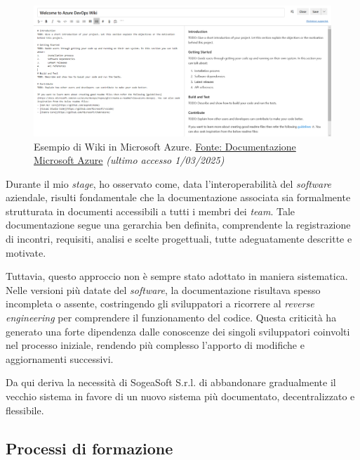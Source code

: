         \begin{figure}[H]
            \centering
            \includegraphics[width=0.9\linewidth]{BCS-Tessi/images/Wiki_Azure.png}
            \caption[Microsoft Azure, Wiki]{Esempio di Wiki in Microsoft Azure. \href{https://learn.microsoft.com/it-it/azure/devops/project/wiki/add-edit-wiki?view=azure-devops&tabs=browser}{Fonte: Documentazione Microsoft Azure} \textit{(ultimo accesso 1/03/2025)}}
            \label{fig:Wiki}
        \end{figure}
        
        \noindent Durante il mio \textit{stage}, ho osservato come, data l’interoperabilità del \textit{software} aziendale, risulti fondamentale che la documentazione associata sia formalmente strutturata in documenti accessibili a tutti i membri dei \textit{team}. Tale documentazione segue una gerarchia ben definita, comprendente la registrazione di incontri, requisiti, analisi e scelte progettuali, tutte adeguatamente descritte e motivate.  

        \vspace{0.2 em}
        \noindent Tuttavia, questo approccio non è sempre stato adottato in maniera sistematica. Nelle versioni più datate del \textit{software}, la documentazione risultava spesso incompleta o assente, costringendo gli sviluppatori a ricorrere al \textit{reverse engineering} per comprendere il funzionamento del codice. Questa criticità ha generato una forte dipendenza dalle conoscenze dei singoli sviluppatori coinvolti nel processo iniziale, rendendo più complesso l’apporto di modifiche e aggiornamenti successivi.  

        \vspace{0.2 em}
        \noindent Da qui deriva la necessità di SogeaSoft S.r.l. di abbandonare gradualmente il vecchio sistema in favore di un nuovo sistema più documentato, decentralizzato e flessibile. 
        
        \subsection{Processi di formazione}
        
